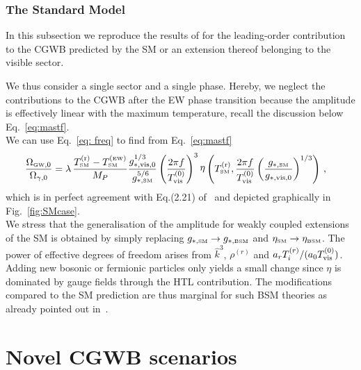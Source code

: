 \documentclass[a4paper,11pt]{article}
\DeclareMathOperator{\heta}{\eta}
\newcommand{\dof}[1]{g_{*,\tiny{#1}}}
\newcommand{\tem}[2]{T_{\tiny{#1}}^{(#2)}}
\begin{document}
\subsubsection{The Standard Model}
\label{sec:VisibleSector}

In this subsection we reproduce the results of \cite{Ghiglieri:2020mhm} for the leading-order contribution to the CGWB predicted by the SM or an extension thereof belonging to the visible sector.

We thus consider a single sector and a single phase.
Hereby, we neglect the contributions to the CGWB after the EW phase transition because the amplitude is effectively linear with the maximum temperature, recall the discussion below Eq.~\eqref{eq:mastf}.\\

We can use Eq.~\eqref{eq: freq} to find from Eq.~\eqref{eq:mastf}
\begin{align}
\dfrac{\Omega_{\text{\tiny{GW}},0} }{ \Omega_{\gamma,0}}&=\lambda\,  
     \frac{\tem{\text{\tiny{SM}}}{\text{r}}-\tem{\text{\tiny{SM}}}{\text{\tiny{EW}}}}{M_{P}}
     \frac{\dof{\text{vis},0}^{1/3}}{\dof{\text{\tiny{SM}}}^{5/6}} \left(\frac{2\pi f}{\tem{\text{vis}}{0}}\right)^3
    \heta \left(\tem{\text{\tiny{SM}}}{\text{r}},\frac{2\pi f}{\tem{\text{vis}}{0}}\left(\frac{\dof{\text{\tiny{SM}}}}{\dof{\text{vis},0}}\right)^{1/3} \right) \,,
\end{align}
which is in perfect agreement with Eq.(2.21) of~\cite{Ringwald:2020ist} and depicted graphically in Fig.~\ref{fig:SMcase}.\\

We stress that the generalisation of the amplitude for weakly coupled extensions of the SM is obtained by simply replacing $g_{*,\text{\tiny{SM}}} \rightarrow g_{*,\text{\tiny{BSM}}}$ and $\eta_{\text{\tiny{SM}}} \rightarrow \eta_{\text{\tiny{BSM}}}$. The power of effective degrees of freedom arises from $\hat{k}^3$, $\rho^{(r)}$ and $ a_{r}\tem{i}{r}/(a_0\tem{\text{vis}}{0})$.
Adding new bosonic or fermionic particles only yields a small change since $\eta$ is dominated by gauge fields through the HTL contribution.
The modifications compared to the SM prediction are thus marginal for such BSM theories as already pointed out in~\cite{Ringwald:2020ist}.

\section{Novel CGWB scenarios}\label{sec:results}
\end{document}
